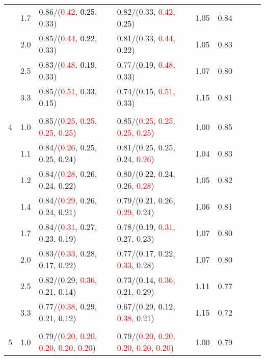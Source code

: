 \documentclass[10pt,a4paper]{report}
\begin{document}
\begin{table}[!htbp]
\begin{center}
{\begin{tabular}{ccllccccc}
			&1.7&0.86/(\textcolor{red}{0.42}, \textcolor{black}{0.25}, 0.33)&0.82/(0.33, \textcolor{red}{0.42}, \textcolor{black}{0.25})&1.05&0.84\\
			&2.0&0.85/(\textcolor{red}{0.44}, \textcolor{black}{0.22}, 0.33)&0.81/(0.33, \textcolor{red}{0.44}, \textcolor{black}{0.22})&1.05&0.83\\
			&2.5&0.83/(\textcolor{red}{0.48}, \textcolor{black}{0.19}, 0.33)&0.77/(\textcolor{black}{0.19}, \textcolor{red}{0.48}, 0.33)&1.07&0.80\\
			&3.3&0.85/(\textcolor{red}{0.51}, 0.33, \textcolor{black}{0.15})&0.74/(\textcolor{black}{0.15}, \textcolor{red}{0.51}, 0.33)&1.15&0.81\\
			&&&&\\
			4			&1.0&0.85/(\textcolor{red}{0.25}, \textcolor{red}{0.25}, \textcolor{red}{0.25}, \textcolor{red}{0.25})&0.85/(\textcolor{red}{0.25}, \textcolor{red}{0.25}, \textcolor{red}{0.25}, \textcolor{red}{0.25})&1.00&0.85\\
			&1.1&0.84/(\textcolor{red}{0.26}, 0.25, 0.25, \textcolor{black}{0.24})&0.81/(0.25, 0.25, \textcolor{black}{0.24}, \textcolor{red}{0.26})&1.04&0.83\\
			&1.2&0.84/(\textcolor{red}{0.28}, 0.26, 0.24, \textcolor{black}{0.22})&0.80/(\textcolor{black}{0.22}, 0.24, 0.26, \textcolor{red}{0.28})&1.05&0.82\\
			&1.4&0.84/(\textcolor{red}{0.29}, 0.26, 0.24, \textcolor{black}{0.21})&0.79/(\textcolor{black}{0.21}, 0.26, \textcolor{red}{0.29}, 0.24)&1.06&0.81\\
			&1.7&0.84/(\textcolor{red}{0.31}, 0.27, 0.23, \textcolor{black}{0.19})&0.78/(\textcolor{black}{0.19}, \textcolor{red}{0.31}, 0.27, 0.23)&1.07&0.80\\
			&2.0&0.83/(\textcolor{red}{0.33}, 0.28, \textcolor{black}{0.17}, 0.22)&0.77/(\textcolor{black}{0.17}, 0.22, \textcolor{red}{0.33}, 0.28)&1.07&0.80\\
			&2.5&0.82/(0.29, \textcolor{red}{0.36}, 0.21, \textcolor{black}{0.14})&0.73/(\textcolor{black}{0.14}, \textcolor{red}{0.36}, 0.21, 0.29)&1.11&0.77\\
			&3.3&0.77/(\textcolor{red}{0.38}, 0.29, 0.21, \textcolor{black}{0.12})&0.67/(0.29, \textcolor{black}{0.12}, \textcolor{red}{0.38}, 0.21)&1.15&0.72\\
			&&&&\\
			5			&1.0&0.79/(\textcolor{red}{0.20}, \textcolor{red}{0.20}, \textcolor{red}{0.20}, \textcolor{red}{0.20}, \textcolor{red}{0.20})&0.79/(\textcolor{red}{0.20}, \textcolor{red}{0.20}, \textcolor{red}{0.20}, \textcolor{red}{0.20}, \textcolor{red}{0.20})&1.00&0.79\\

\end{tabular}}
\end{center}
\end{table}
\end{document}
